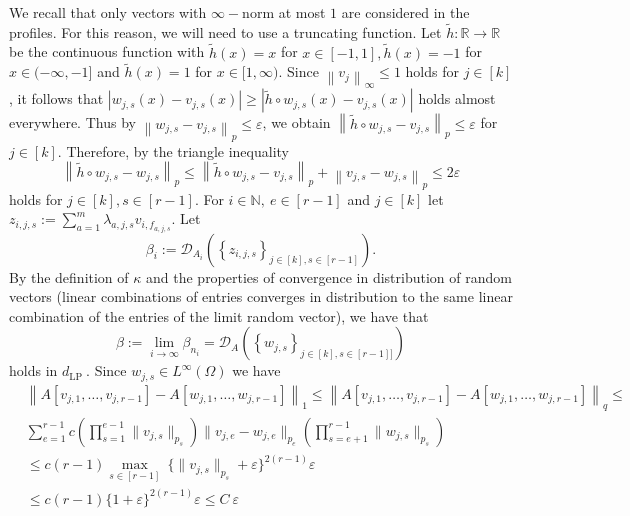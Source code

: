 \documentclass[11pt]{article}
\begin{document}
We recall that only vectors with $\infty-$norm at most $1$ are considered in the profiles. For this reason, we will need to use a truncating function. Let $\tilde{h}: \mathbb{R} \rightarrow \mathbb{R}$ be the continuous function with $\tilde{h}(x)=x$ for $x \in[-1,1], \tilde{h}(x)=-1$ for $x \in(-\infty,-1]$ and $\tilde{h}(x)=1$ for $x \in[1, \infty)$. Since $\left\|v_{j}\right\|_{\infty} \leq 1$ holds for $j \in[k]$, it follows that $\left|w_{j,s}(x)-v_{j,s}(x)\right| \geq\left|\tilde{h} \circ w_{j,s}(x)-v_{j,s}(x)\right|$ holds almost everywhere. Thus by $\left\|w_{j,s}-v_{j,s}\right\|_{p} \leq \varepsilon$, we obtain $\left\|\tilde{h} \circ w_{j,s}-v_{j,s}\right\|_{p} \leq \varepsilon$ for $j \in [k]$. Therefore,  by the triangle inequality
\begin{equation}\label{eqn:EqIneqLp}
\left\|\tilde{h} \circ w_{j,s}-w_{j,s}\right\|_{p} \leq\left\|\tilde{h} \circ w_{j,s}-v_{j,s}\right\|_{p}+\left\|v_{j,s}-w_{j,s}\right\|_{p} \leq 2 \varepsilon\end{equation}
holds for $j \in[k],s\in[r-1]$.
For $i \in \mathbb{N}, \ e\in [r-1]$ and $j \in[k]$ let $z_{i, j,s}:=\sum_{a=1}^{m} \lambda_{a, j,s} v_{i, f_{a,j,s}}$. Let $$\beta_{i}:=\mathcal{D}_{A_{i}}\left(\left\{z_{i, j,s}\right\}_{j\in [k], s\in [r-1]}\right).$$ By the definition of $\kappa$ and the properties of convergence in distribution of random vectors (linear combinations of entries converges in distribution to the same linear combination of the entries of the limit random vector), we have that
$$
\beta:=\lim _{i \rightarrow \infty} \beta_{n_{i}}=\mathcal{D}_{A}\left(\left\{w_{j,s}\right\}_{j\in [k],s\in [r-1]]}\right)
$$
holds in $d_{\text {LP  }}$. Since  $w_{j,s} \in L^{\infty}(\Omega)$ we have $$\begin{aligned}
&\left\| A[v_{j,1},\ldots, v_{j,r-1}]- A[w_{j,1}, \ldots , w_{j,r-1}]\right\|_{1} \leq\left\| A[v_{j,1},\ldots, v_{j,r-1}]- A[w_{j,1}, \ldots , w_{j,r-1}]\right\|_{q} \leq \\
&\sum^{r-1}_{e=1}c \left(\prod^{e-1}_{s=1}\| v_{j,s}\|_{p_s}\right)\| v_{j,e}-w_{j,e} \|_{p_e}\left(\prod^{r-1}_{s=e+1}\| w_{j,s}\|_{p_s}\right)\\
& \leq c (r-1)\max_{s\in [r-1]}\ \{\|v_{j,s}\|_{p_s}+\varepsilon\}^{2(r-1)}\varepsilon\\
& \leq c (r-1)\{1+\varepsilon\}^{2(r-1)}\varepsilon\leq C\ \varepsilon\end{aligned} $$
\end{document}

